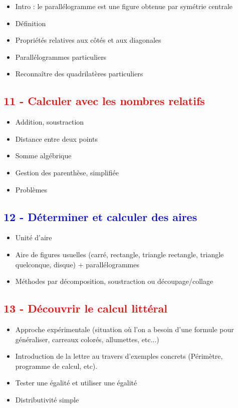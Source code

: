 \documentclass[12pt]{article}
\begin{document}
\begin{multicols}{2}
\begin{itemize}
\item Intro : le parallélogramme est une figure obtenue par symétrie centrale
\item Définition
\item Propriétés relatives aux côtés et aux diagonales
\item Parallélogrammes particuliers
\item Reconnaître des quadrilatères particuliers
\end{itemize}

\subsection*{\textcolor{red}{11 - Calculer avec les nombres relatifs}}

\begin{itemize}
\item Addition, soustraction
\item Distance entre deux points
\item Somme algébrique
\item Gestion des parenthèse, simplifiée
\item Problèmes
\end{itemize}

\columnbreak

\subsection*{\textcolor{blue}{12 - Déterminer et calculer des aires}}

\begin{itemize}
\item Unité d’aire
\item Aire de figures usuelles (carré, rectangle, triangle rectangle, triangle quelconque, disque) + parallélogrammes
\item Méthodes par décomposition, soustraction ou découpage/collage
\end{itemize}

\subsection*{\textcolor{red}{13 - Découvrir le calcul littéral}}

\begin{itemize}
\item Approche expérimentale (situation où l'on a besoin d'une formule pour généraliser, carreaux colorés, allumettes, etc...)
\item Introduction de la lettre au travers d'exemples concrets (Périmètre, programme de calcul, etc).
\item Tester une égalité et utiliser une égalité
\item Distributivité simple
\end{itemize}


\end{multicols}
\end{document}
